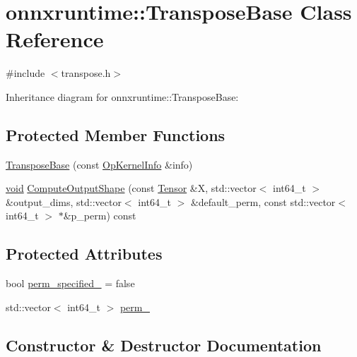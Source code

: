 \hypertarget{classonnxruntime_1_1TransposeBase}{}\section{onnxruntime\+:\+:Transpose\+Base Class Reference}
\label{classonnxruntime_1_1TransposeBase}


{\ttfamily \#include $<$transpose.\+h$>$}



Inheritance diagram for onnxruntime\+:\+:Transpose\+Base\+:
\subsection*{Protected Member Functions}
\begin{DoxyCompactItemize}
\item 
\mbox{\hyperlink{classonnxruntime_1_1TransposeBase_aa62896c131835f8ecdc76027266c2a61}{Transpose\+Base}} (const \mbox{\hyperlink{classonnxruntime_1_1OpKernelInfo}{Op\+Kernel\+Info}} \&info)
\item 
\mbox{\hyperlink{mlasi_8h_a88f941d423cb2a819b70a1358982b1a6}{void}} \mbox{\hyperlink{classonnxruntime_1_1TransposeBase_a7fefe794b110fe706187c25dae4f0b74}{Compute\+Output\+Shape}} (const \mbox{\hyperlink{classonnxruntime_1_1Tensor}{Tensor}} \&X, std\+::vector$<$ int64\+\_\+t $>$ \&output\+\_\+dims, std\+::vector$<$ int64\+\_\+t $>$ \&default\+\_\+perm, const std\+::vector$<$ int64\+\_\+t $>$ $\ast$\&p\+\_\+perm) const
\end{DoxyCompactItemize}
\subsection*{Protected Attributes}
\begin{DoxyCompactItemize}
\item 
bool \mbox{\hyperlink{classonnxruntime_1_1TransposeBase_a61ce1837b9fb0de4811bd324f3d4c582}{perm\+\_\+specified\+\_\+}} = false
\item 
std\+::vector$<$ int64\+\_\+t $>$ \mbox{\hyperlink{classonnxruntime_1_1TransposeBase_a13bfaf981fd59875af221183e642b21d}{perm\+\_\+}}
\end{DoxyCompactItemize}


\subsection{Constructor \& Destructor Documentation}
\mbox{\label{classonnxruntime_1_1TransposeBase_aa62896c131835f8ecdc76027266c2a61}} 
